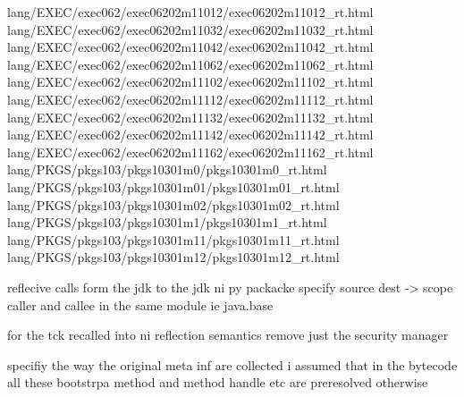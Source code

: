 lang/EXEC/exec062/exec06202m11012/exec06202m11012_rt.html
lang/EXEC/exec062/exec06202m11032/exec06202m11032_rt.html
lang/EXEC/exec062/exec06202m11042/exec06202m11042_rt.html
lang/EXEC/exec062/exec06202m11062/exec06202m11062_rt.html
lang/EXEC/exec062/exec06202m11102/exec06202m11102_rt.html
lang/EXEC/exec062/exec06202m11112/exec06202m11112_rt.html
lang/EXEC/exec062/exec06202m11132/exec06202m11132_rt.html
lang/EXEC/exec062/exec06202m11142/exec06202m11142_rt.html
lang/EXEC/exec062/exec06202m11162/exec06202m11162_rt.html
lang/PKGS/pkgs103/pkgs10301m0/pkgs10301m0_rt.html
lang/PKGS/pkgs103/pkgs10301m01/pkgs10301m01_rt.html
lang/PKGS/pkgs103/pkgs10301m02/pkgs10301m02_rt.html
lang/PKGS/pkgs103/pkgs10301m1/pkgs10301m1_rt.html
lang/PKGS/pkgs103/pkgs10301m11/pkgs10301m11_rt.html
lang/PKGS/pkgs103/pkgs10301m12/pkgs10301m12_rt.html



reflecive calls form the jdk to the jdk
ni py packacke 
specify source dest -> scope
caller and callee in the same module ie java.base

for the tck
recalled into ni reflection semantics
remove just the security manager

specifiy the way the original meta inf are collected i  
assumed that in the bytecode all these bootstrpa method and method handle etc are preresolved otherwise


